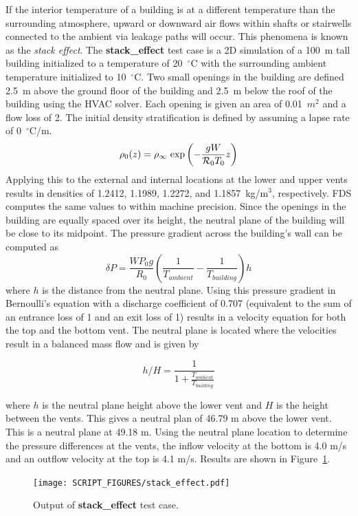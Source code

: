 \documentclass[11pt]{book}
\newcommand{\be}{\begin{equation}}
\newcommand{\ee}{\end{equation}}
\begin{document}
If the interior temperature of a building is at a different temperature than the surrounding atmosphere, upward or
downward air flows within shafts
or stairwells connected to the ambient via leakage paths will occur.
This phenomena is known as the {\em stack effect}.  The {\bf stack\_effect} test case
is a 2D simulation of a 100~m tall building initialized to a temperature of 20~$^\circ$C with the surrounding ambient
temperature initialized to
10~$^\circ$C. Two small openings in the building are defined 2.5~m above the ground floor of the building
and 2.5~m below the roof of the building using the HVAC solver.  Each opening is given an area of 0.01~$m^2$ and a flow loss of 2.
The initial density stratification is defined by assuming a lapse rate of 0~$^\circ$C/m.
\be
   \rho_0(z) = \rho_\infty \, \exp \left(- \frac{g W}{{\cal R}_0 T_0} z \right)
\ee
Applying this to the external and internal locations at the lower and upper vents results in densities of 1.2412, 1.1989, 1.2272, and
1.1857~kg/m$^3$, respectively.  FDS computes the same values to within machine precision.  Since the openings in the building are equally spaced over
its height, the neutral plane of the building will be close to its midpoint.
The pressure gradient across the building's wall can be computed as
\be
   \delta P = \frac{W P_0 g} {R_{0}} \left( \frac{1}{T_{ambient}} - \frac{1}{T_{building}} \right) h
\ee
where $h$ is the distance from the neutral plane.  Using this pressure gradient in
Bernoulli's equation with a discharge coefficient of 0.707 (equivalent to the sum of an entrance loss of 1 and an exit loss of 1) results in a velocity equation for both the top and the bottom vent.  The neutral plane is located where the velocities result in a balanced mass flow and is given by

\be h/H = \frac{1}{1+\frac{T_{ambient}}{T_{building}}} \ee

where $h$ is the neutral plane height above the lower vent and $H$ is the height between the vents.  This gives a neutral plan of 46.79 m above the lower vent.  This is a neutral plane at 49.18 m.  Using the neutral plane location to determine the pressure differences at the vents, the inflow velocity at the bottom is 4.0 m/s and an outflow velocity at the top is 4.1 m/s.  Results are shown in Figure~\ref{stack_effect}.

\begin{figure}[ht]
\texttt{[image: SCRIPT\_FIGURES/stack\_effect.pdf]}
\caption[Output of {\bf stack\_effect} test case.]{Output of {\bf stack\_effect} test case. }
\label{stack_effect}
\end{figure}
\end{document}
